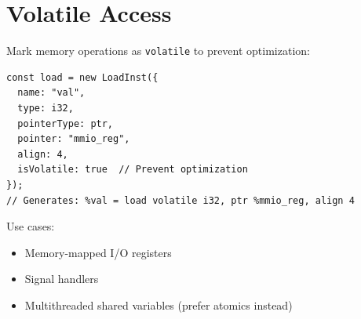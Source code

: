 \section{Volatile Access}

Mark memory operations as \texttt{volatile} to prevent optimization:

\begin{lstlisting}[style=ts]
const load = new LoadInst({
  name: "val",
  type: i32,
  pointerType: ptr,
  pointer: "mmio_reg",
  align: 4,
  isVolatile: true  // Prevent optimization
});
// Generates: %val = load volatile i32, ptr %mmio_reg, align 4
\end{lstlisting}

Use cases:
\begin{itemize}[noitemsep]
  \item Memory-mapped I/O registers
  \item Signal handlers
  \item Multithreaded shared variables (prefer atomics instead)
\end{itemize}


